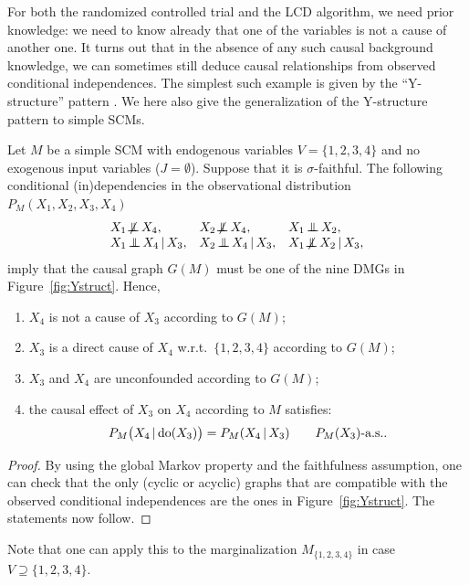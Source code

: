 For both the randomized controlled trial and the LCD algorithm, we need prior knowledge: we need to know already that one of the variables is not a cause of another one. 
It turns out that in the absence of any such causal background knowledge, we can sometimes still deduce causal relationships from observed conditional independences.
The simplest such example is given by the ``Y-structure'' pattern \cite{ManiPhD2006}.
We here also give the generalization of the Y-structure pattern to simple SCMs.
\begin{Prp}\label{prp:y-structures}
  Let $M$ be a simple SCM with endogenous variables $V = \{1,2,3,4\}$ and no exogenous input variables ($J = \emptyset$).
  Suppose that it is $\sigma$-faithful. 
  The following conditional (in)dependencies in the observational distribution $P_{M}(X_1,X_2,X_3,X_4)$
  $$\begin{array}{lll}
    X_1 \nIndep X_4,  & X_2 \nIndep X_4, & X_1 \Indep X_2, \\
    X_1 \Indep X_4 \given X_3, & X_2 \Indep X_4 \given X_3, & X_1 \nIndep X_2 \given X_3,
  \end{array}$$
  imply that the causal graph $G(M)$ must be one of the nine DMGs in Figure~\ref{fig:Ystruct}.
  Hence,
  \begin{enumerate}
    \item $X_4$ is not a cause of $X_3$ according to $G(M)$;
    \item $X_3$ is a direct cause of $X_4$ w.r.t.\ $\{1,2,3,4\}$ according to $G(M)$;
    \item $X_3$ and $X_4$ are unconfounded according to $G(M)$;
    \item the causal effect of $X_3$ on $X_4$ according to $M$ satisfies:
  \begin{equation}\label{eq:Y_causal_effect}
    P_{M}\big(X_4 \operatorname*{|} \operatorname{do}(X_3)\big) = P_{M}(X_4 \operatorname*{|} X_3) \qquad P_M(X_3)\text{-a.s.}.
  \end{equation}
  \end{enumerate}
\end{Prp}
\begin{proof}
By using the global Markov property and the faithfulness assumption, one
can check that the only (cyclic or acyclic) graphs that are compatible with the observed
conditional independences are the ones in Figure~\ref{fig:Ystruct}.
The statements now follow.
\end{proof}
Note that one can apply this to the marginalization $M_{\{1,2,3,4\}}$ in case $V \supseteq \{1,2,3,4\}$.

